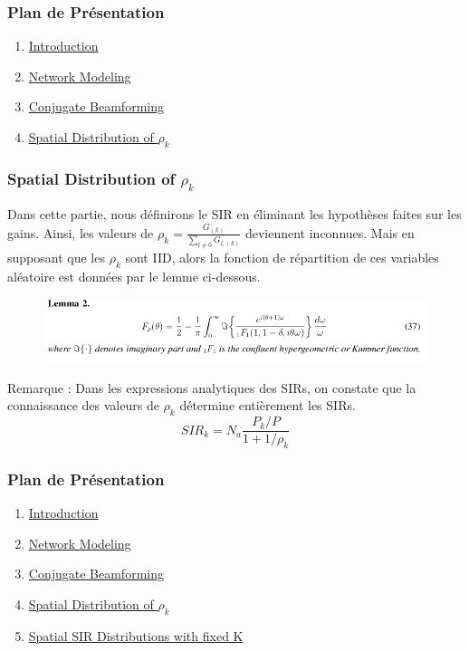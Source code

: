 \documentclass[pdf]{beamer}
\begin{document}
\begin{frame}
\frametitle{Plan de Présentation }
\begin{enumerate}
	\item \hyperlink{Introduction}{Introduction}
	\item \hyperlink{networkModeling}{Network Modeling}
	\item \hyperlink{conjugateBeamforming}{Conjugate Beamforming}
	\item \hyperlink{spatialDistribution}{Spatial Distribution of $\rho_k$}
\end{enumerate}
\end{frame}

\begin{frame}[label=spatialDistribution]
\frametitle{Spatial Distribution of $\rho_k$}
\transblindshorizontal
Dans cette partie, nous définirons le SIR en éliminant les hypothèses faites sur les gains. Ainsi, les valeurs de $\rho_k=\frac{G_{(k)}}{\sum_{l \neq 0}G_{l,(k)}}$ deviennent inconnues. Mais en supposant que les $\rho_k$ sont IID, alors la fonction de répartition de ces variables aléatoire est données par le lemme ci-dessous.
\begin{figure}
	\includegraphics[width=1\linewidth]{123}
\end{figure} \pause
\begin{exampleblock}{Remarque :}
\justify
Dans les expressions analytiques des SIRs, on constate que la connaissance des valeurs de $\rho_k$ détermine entièrement les SIRs. $$SIR_k = N_a \frac{P_k/P}{1+1/\rho_k}$$
\end{exampleblock}
\end{frame}

\begin{frame}
\frametitle{Plan de Présentation }
\begin{enumerate}
	\item \hyperlink{Introduction}{Introduction}
	\item \hyperlink{networkModeling}{Network Modeling}
	\item \hyperlink{conjugateBeamforming}{Conjugate Beamforming}
	\item \hyperlink{spatialDistribution}{Spatial Distribution of $\rho_k$}
	\item \hyperlink{spatialsir}{Spatial SIR Distributions with fixed K}
\end{enumerate}
\end{frame}
\end{document}

